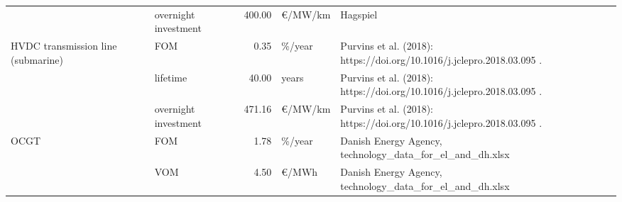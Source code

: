 \begin{longtable}{p{4cm}p{4cm}rp{3cm}p{10cm}}
                      & overnight investment &       400.00 &                   \euro/MW/km &                                                                                                                                                                                                                                                                                                                             Hagspiel \\
HVDC transmission line (submarine) & FOM &         0.35 &                       \%/year &                                                                                                                                                                                                                                                               Purvins et al. (2018): https://doi.org/10.1016/j.jclepro.2018.03.095 . \\
                      & lifetime &        40.00 &                         years &                                                                                                                                                                                                                                                               Purvins et al. (2018): https://doi.org/10.1016/j.jclepro.2018.03.095 . \\
                      & overnight investment &       471.16 &                   \euro/MW/km &                                                                                                                                                                                                                                                               Purvins et al. (2018): https://doi.org/10.1016/j.jclepro.2018.03.095 . \\
OCGT & FOM &         1.78 &                       \%/year &                                                                                                                                                                                                                                                                        Danish Energy Agency, technology\_data\_for\_el\_and\_dh.xlsx \\
                      & VOM &         4.50 &                     \euro/MWh &                                                                                                                                                                                                                                                                        Danish Energy Agency, technology\_data\_for\_el\_and\_dh.xlsx \\

\end{longtable}
